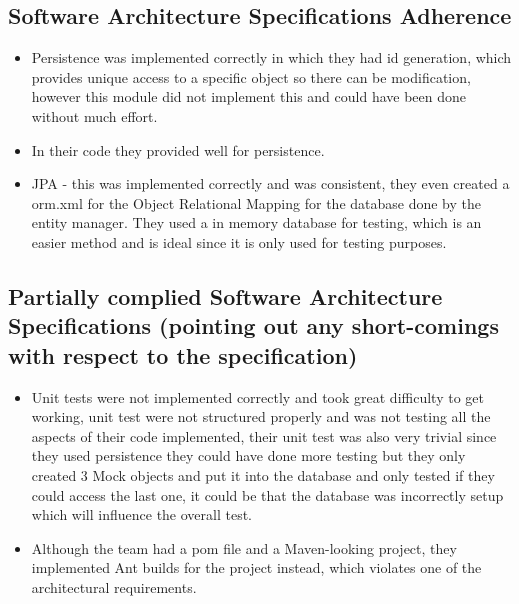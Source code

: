 \documentclass{article}
\begin{document}
	\subsection{Software Architecture Specifications Adherence}
	\begin{itemize}

	\item Persistence was implemented correctly in which they had id generation, which provides unique access to a specific object so there can be modification, however this module did not implement this and could have been done without much effort. 

			\item In their code they provided well for persistence.
		\item JPA - this was implemented correctly and was consistent, they even created a orm.xml for the Object Relational Mapping for the database done by the entity manager. They used a in memory database for testing, which is an easier method and is ideal since it is only used for testing purposes.
	\item@TODO

	\end{itemize}

	\subsection{Partially complied Software Architecture Specifications (pointing out any short-comings with respect to the specification)}

	\begin{itemize}

		\item Unit tests were not implemented correctly and took great difficulty to get working, unit test were not structured properly and was not testing all the aspects of their code implemented, their unit test was also very trivial since they used persistence they could have done more testing but they only created 3 Mock objects and put it into the database and only tested if they could access the last one, it could be that the database was incorrectly setup which will influence the overall test.
		\item Although the team had a pom file and a Maven-looking project, they implemented Ant builds for the project instead, which violates one of the architectural requirements.
		\item@TODO
	\end{itemize}
\end{document}
